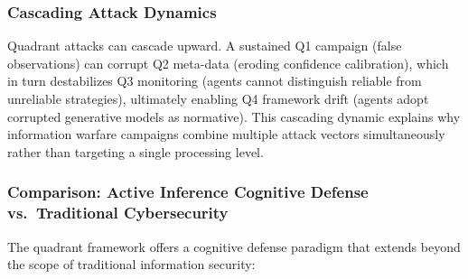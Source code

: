 \documentclass[
]{article}
\begin{document}
\subsubsection{Cascading Attack
Dynamics}\label{cascading-attack-dynamics}

Quadrant attacks can cascade upward. A sustained Q1 campaign (false
observations) can corrupt Q2 meta-data (eroding confidence calibration),
which in turn destabilizes Q3 monitoring (agents cannot distinguish
reliable from unreliable strategies), ultimately enabling Q4 framework
drift (agents adopt corrupted generative models as normative). This
cascading dynamic explains why information warfare campaigns combine
multiple attack vectors simultaneously rather than targeting a single
processing level.

\subsubsection{Comparison: Active Inference Cognitive Defense
vs.~Traditional
Cybersecurity}\label{comparison-active-inference-cognitive-defense-vs.-traditional-cybersecurity}

The quadrant framework offers a cognitive defense paradigm that extends
beyond the scope of traditional information security:
\end{document}

